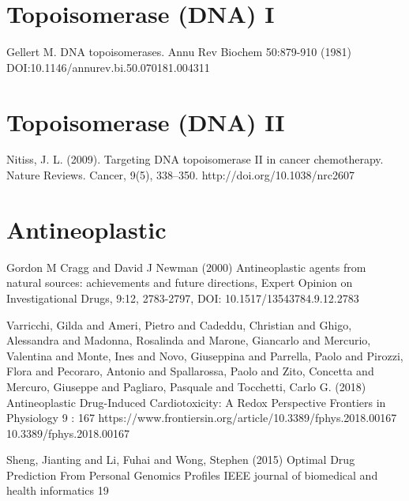 \begin{thebibliography}{00}
\section{Topoisomerase (DNA) I}

Gellert M.
\newblock DNA topoisomerases.
\newblock Annu Rev Biochem 50:879-910 (1981) DOI:10.1146/annurev.bi.50.070181.004311

\section{Topoisomerase (DNA) II}

Nitiss, J. L. (2009). 
\newblock Targeting DNA topoisomerase II in cancer chemotherapy. Nature Reviews. 
\newblock Cancer, 9(5), 338–350. http://doi.org/10.1038/nrc2607
\section{Antineoplastic}

Gordon M Cragg and David J Newman (2000) 
\newblock Antineoplastic agents from natural sources: achievements and future directions, 
\newblock Expert Opinion on Investigational Drugs, 9:12, 2783-2797, DOI: 10.1517/13543784.9.12.2783

Varricchi, Gilda and Ameri, Pietro and Cadeddu, Christian and Ghigo, Alessandra and Madonna, Rosalinda and Marone, Giancarlo and Mercurio, Valentina and Monte, Ines and Novo, Giuseppina and Parrella, Paolo and Pirozzi, Flora and Pecoraro, Antonio and Spallarossa, Paolo and Zito, Concetta and Mercuro, Giuseppe and Pagliaro, Pasquale and Tocchetti, Carlo G. (2018)  
\newblock Antineoplastic Drug-Induced Cardiotoxicity: A Redox Perspective 
\newblock Frontiers in Physiology 9 : 167  https://www.frontiersin.org/article/10.3389/fphys.2018.00167 10.3389/fphys.2018.00167

Sheng, Jianting and Li, Fuhai and Wong, Stephen (2015)
\newblock Optimal Drug Prediction From Personal Genomics Profiles
\newblock IEEE journal of biomedical and health informatics 19


\end{thebibliography}
